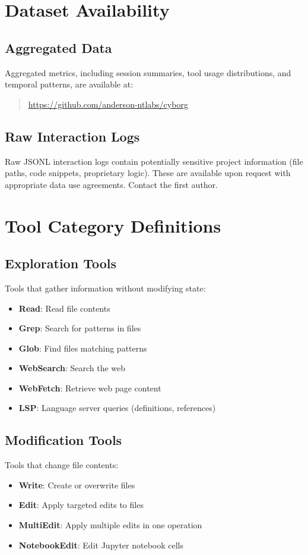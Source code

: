 
\section{Dataset Availability}

\subsection{Aggregated Data}

Aggregated metrics, including session summaries, tool usage distributions, and temporal patterns, are available at:

\begin{quote}
\url{https://github.com/anderson-ntlabs/cyborg}
\end{quote}

\subsection{Raw Interaction Logs}

Raw JSONL interaction logs contain potentially sensitive project information (file paths, code snippets, proprietary logic). These are available upon request with appropriate data use agreements. Contact the first author.

\section{Tool Category Definitions}

\subsection{Exploration Tools}
Tools that gather information without modifying state:
\begin{itemize}
    \item \textbf{Read}: Read file contents
    \item \textbf{Grep}: Search for patterns in files
    \item \textbf{Glob}: Find files matching patterns
    \item \textbf{WebSearch}: Search the web
    \item \textbf{WebFetch}: Retrieve web page content
    \item \textbf{LSP}: Language server queries (definitions, references)
\end{itemize}

\subsection{Modification Tools}
Tools that change file contents:
\begin{itemize}
    \item \textbf{Write}: Create or overwrite files
    \item \textbf{Edit}: Apply targeted edits to files
    \item \textbf{MultiEdit}: Apply multiple edits in one operation
    \item \textbf{NotebookEdit}: Edit Jupyter notebook cells
\end{itemize}

